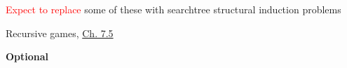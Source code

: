 \documentclass[handout]{mcs}
\begin{document}

\begin{staffnotes}
\textcolor{red}{Expect to replace} some of these with searchtree structural induction problems

Recursive games,
\href{https://courses.csail.mit.edu/6.042/spring17/recursive_data.pdf#recursive_games}
     {Ch. 7.5}
\end{staffnotes}







\begin{center}
\textbf{Optional}
\end{center}





\end{document}
